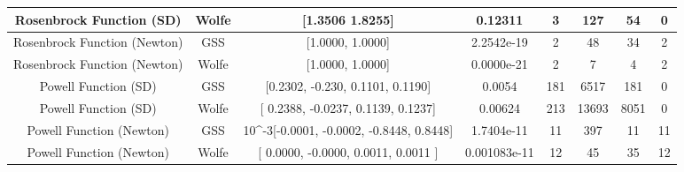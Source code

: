 \documentclass{article}
\begin{document}
\begin{landscape}
\begin{latin}
\begin{table}[h!]
\begin{tabular}{|c|c|c|c|c|c|c|c|}
		Rosenbrock Function  (SD)     & Wolfe    & {[}1.3506 1.8255{]}                                          &      0.12311
		& 3     & 127         & 54          & 0              \\	
		
		 \hline
		 
		Rosenbrock Function (ٔNewton) & GSS    & {[}1.0000, 1.0000{]}                                          & 2.2542e-19 & 2       & 48            & 34             & 2              \\ 
		
		Rosenbrock Function (ٔNewton)  & Wolfe   & {[}1.0000, 1.0000{]}                                          & 0.0000e-21 & 2       & 7            & 4             & 2              \\ 
		
		\hline
		
		Powell Function (SD)  & GSS    & {[}0.2302, -0.230, 0.1101, 0.1190{]}                          & 0.0054     & 181     & 6517          & 181           & 0              \\
		
		Powell Function (SD) & Wolfe      & {[}   0.2388, -0.0237, 0.1139,   0.1237{]}                          & 0.00624    & 213     & 13693          & 8051           & 0              \\	
		 \hline
		
		Powell Function (Newton) & GSS & 10\textasciicircum{}-3{[}-0.0001, -0.0002, -0.8448, 0.8448{]} & 1.7404e-11 & 11      & 397           & 11            & 11             \\ 
		
		Powell Function (Newton) & Wolfe & {[}   0.0000,  -0.0000,  0.0011, 0.0011 {]} & 0.001083e-11 & 12      & 45           & 35            & 12             \\ 
		
		
		\hline
	\end{tabular}
\end{table}
\end{latin}

\end{landscape}
\end{document}
